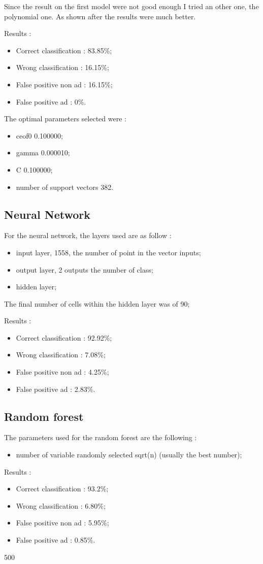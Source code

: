 Since the result on the first model were not good enough I tried an other one, the polynomial one. As shown after the results were much better.

Results :
\begin{itemize}
  \item Correct classification : 83.85\%;
  \item Wrong classification : 16.15\%;
  \item False positive non ad : 16.15\%;
  \item False positive ad : 0\%.
\end{itemize}

The optimal parameters selected were :
\begin{itemize}
  \item ceof0 0.100000;
  \item gamma 0.000010;
  \item C 0.100000;
  \item number of support vectors 382.
\end{itemize}

\subsection{Neural Network}
For the neural network, the layers used are as follow :
  \begin{itemize}
    \item input layer, 1558, the number of point in the vector inputs;
    \item output layer, 2 outputs the number of class;
    \item hidden layer;
  \end{itemize}

The final number of cells within the hidden layer was of 90;

  Results :
  \begin{itemize}
    \item Correct classification : 92.92\%;
    \item Wrong classification : 7.08\%;
    \item False positive non ad : 4.25\%;
    \item False positive ad : 2.83\%.
  \end{itemize}


\subsection{Random forest}
The parameters used for the random forest are the following :
  \begin{itemize}
    \item number of variable randomly selected sqrt(n) (usually the best number);
  \end{itemize}
Results :
\begin{itemize}
  \item Correct classification : 93.2\%;
  \item Wrong classification : 6.80\%;
  \item False positive non ad : 5.95\%;
  \item False positive ad : 0.85\%.
\end{itemize}

500
